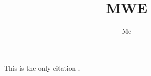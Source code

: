 \documentclass{scrartcl}
\title{MWE}
\author{Me}
\begin{document}
\maketitle 

This is the only citation \parencite{A01}.

\printbibliography
\end{document}
